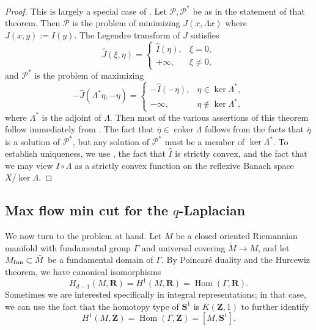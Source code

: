 \documentclass[reqno,11pt]{amsart}
\newcommand{\ZZ}{\mathbf{Z}}
\newcommand{\RR}{\mathbf{R}}
\newcommand{\Sph}{\mathbf S}
\DeclareMathOperator{\Hom}{Hom}
\DeclareMathOperator{\coker}{coker}
\theoremstyle{definition}
\numberwithin{equation}{section}
\begin{document}
\begin{proof}
This is largely a special case of \cite[Chapter IV, Theorem 4.2]{Ekeland99}.
Let $\mathscr P, \mathscr P^*$ be as in the statement of that theorem.
Then $\mathscr P$ is the problem of minimizing $J(x, \Lambda x)$ where $J(x, y) := I(y)$.
The Legendre transform of $J$ satisfies 
$$\hat J(\xi, \eta) = \begin{cases} \hat I(\eta), & \xi = 0, \\
	+\infty, &\xi \neq 0,
\end{cases}$$
and $\mathscr P^*$ is the problem of maximizing
$$-\hat J(\Lambda^* \eta, -\eta) = \begin{cases}
	-\hat I(-\eta), &\eta \in \ker \Lambda^*, \\
	-\infty, &\eta \notin \ker \Lambda^*,
\end{cases}$$
where $\Lambda^*$ is the adjoint of $\Lambda$.
Then most of the various assertions of this theorem follow immediately from \cite[Chapter IV, Theorem 4.2]{Ekeland99}.
The fact that $\overline \eta \in \coker \Lambda$ follows from the facts that $\overline \eta$ is a solution of $\mathscr P^*$, but any solution of $\mathscr P^*$ must be a member of $\ker \Lambda^*$. 
To establish uniqueness, we use \cite[Chapter II, Proposition 1.2]{Ekeland99}, the fact that $\hat I$ is strictly convex, and the fact that we may view $I \circ \Lambda$ as a strictly convex function on the reflexive Banach space $X/\ker \Lambda$.
\end{proof}


\subsection{Max flow min cut for the \texorpdfstring{$q$-Laplacian}{q-Laplacian}}
We now turn to the problem at hand.
Let $M$ be a closed oriented Riemannian manifold with fundamental group $\Gamma$ and universal covering $\tilde M \to M$, and let $M_{\rm fun} \subset \tilde M$ be a fundamental domain of $\Gamma$.
By Poincar\'e duality and the Hurcewiz theorem, we have canonical isomorphisms
\begin{equation}\label{Poincare Hurcewiz}
H_{d - 1}(M, \RR) = H^1(M, \RR) = \Hom(\Gamma, \RR).
\end{equation}
Sometimes we are interested specifically in integral representations; in that case, we can use the fact that the homotopy type of $\Sph^1$ is $K(\ZZ, 1)$ to further identify 
\begin{equation}\label{Poincare Hurcewiz 2}
H^1(M, \ZZ) = \Hom(\Gamma, \ZZ) = [M, \Sph^1].
\end{equation}
\end{document}
